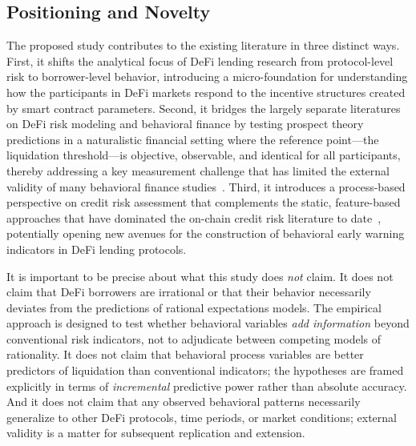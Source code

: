 \subsection{Positioning and Novelty}

The proposed study contributes to the existing literature in three distinct ways. First, it shifts the analytical focus of DeFi lending research from protocol-level risk to borrower-level behavior, introducing a micro-foundation for understanding how the participants in DeFi markets respond to the incentive structures created by smart contract parameters. Second, it bridges the largely separate literatures on DeFi risk modeling and behavioral finance by testing prospect theory predictions in a naturalistic financial setting where the reference point—the liquidation threshold—is objective, observable, and identical for all participants, thereby addressing a key measurement challenge that has limited the external validity of many behavioral finance studies~\cite{barberis2013thirty}. Third, it introduces a process-based perspective on credit risk assessment that complements the static, feature-based approaches that have dominated the on-chain credit risk literature to date~\cite{ghosh2024onchain}, potentially opening new avenues for the construction of behavioral early warning indicators in DeFi lending protocols.

It is important to be precise about what this study does \emph{not} claim. It does not claim that DeFi borrowers are irrational or that their behavior necessarily deviates from the predictions of rational expectations models. The empirical approach is designed to test whether behavioral variables \emph{add information} beyond conventional risk indicators, not to adjudicate between competing models of rationality. It does not claim that behavioral process variables are better predictors of liquidation than conventional indicators; the hypotheses are framed explicitly in terms of \emph{incremental} predictive power rather than absolute accuracy. And it does not claim that any observed behavioral patterns necessarily generalize to other DeFi protocols, time periods, or market conditions; external validity is a matter for subsequent replication and extension.


\vspace{4pt}
